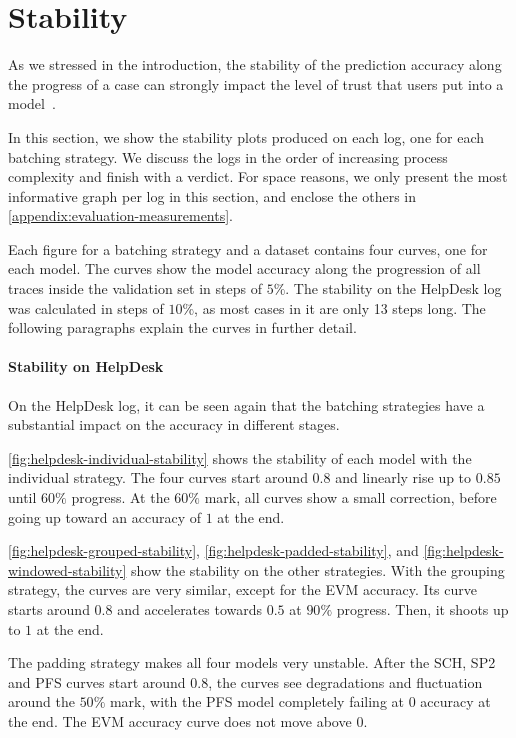 \section{Stability}\label{sec:eval:stability}
As we stressed in the introduction, the stability of the prediction accuracy along the progress of a case can strongly impact the level of trust that users put into a model~\cite{metzger2015}.

In this section, we show the stability plots produced on each log, one for each batching strategy.
We discuss the logs in the order of increasing process complexity and finish with a verdict.
For space reasons, we only present the most informative graph per log in this section, and enclose the others in \autoref{appendix:evaluation-measurements}.

Each figure for a batching strategy and a dataset contains four curves, one for each model.
The curves show the model accuracy along the progression of all traces inside the validation set in steps of $5\%$.
The stability on the HelpDesk log was calculated in steps of $10\%$, as most cases in it are only 13 steps long.
The following paragraphs explain the curves in further detail.

\paragraph{Stability on HelpDesk}
On the HelpDesk log, it can be seen again that the batching strategies have a substantial impact on the accuracy in different stages.

\autoref{fig:helpdesk-individual-stability} shows the stability of each model with the individual strategy.
The four curves start around $0.8$ and linearly rise up to $0.85$ until $60\%$ progress.
At the $60\%$ mark, all curves show a small correction, before going up toward an accuracy of $1$ at the end.

\autoref{fig:helpdesk-grouped-stability}, \autoref{fig:helpdesk-padded-stability}, and \autoref{fig:helpdesk-windowed-stability} show the stability on the other strategies.
With the grouping strategy, the curves are very similar, except for the EVM accuracy.
Its curve starts around $0.8$ and accelerates towards $0.5$ at $90\%$ progress.
Then, it shoots up to $1$ at the end.

The padding strategy makes all four models very unstable.
After the SCH, SP2 and PFS curves start around $0.8$, the curves see degradations and fluctuation around the $50\%$ mark, with the PFS model completely failing at $0$ accuracy at the end.
The EVM accuracy curve does not move above $0$.

